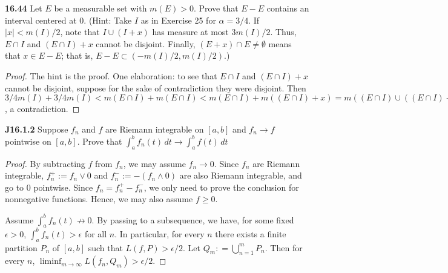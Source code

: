 \documentclass{article}
\newcommand{\p}{\textbf}
\begin{document}
\p{16.44} Let $E$ be a measurable set with $m(E) > 0$. Prove that $E-E$ contains an interval centered at 0. (Hint: Take $I$ as in Exercise 25 for $\alpha = 3/4$. If $|x| < m(I)/2$, note that $I \cup (I + x)$ has measure at most $3m(I)/2$. Thus, $E \cap I $ and $(E \cap I) + x$ cannot be disjoint. Finally, $(E+x) \cap E \neq \emptyset$ means that $x \in E - E$; that is, $E - E \subset (-m(I)/2, m(I)/2)$.)
\begin{proof}
The hint is the proof.  One elaboration: to see that $E \cap I$ and $(E \cap I) +x$ cannot be disjoint, suppose for the sake of contradiction they were disjoint.  Then $3/4 m(I) + 3/4 m(I) < m(E \cap I) + m(E \cap I) < m(E \cap I) + m((E \cap I) + x) = m((E \cap I) \cup ((E \cap I) + x)) = m (E \cap (I \cup (I+x))) \leq m(I \cup I +x) \leq 3/2 m(I)$, a contradiction.
\end{proof}

\begin{comment}
\p{J16.1.1} Suppose $f_n \in C[0,1], 0 \leq f_n \leq 1$, and $f_n \rightarrow 0$ pointwise on $[0,1]$. Prove that $\int_0^1 f_n(t)\,dt \rightarrow 0$ as $n \rightarrow \infty$.
\begin{proof}
\end{proof}
\end{comment}

\p{J16.1.2} Suppose $f_n$ and $f$ are Riemann integrable on $[a,b]$ and $f_n \rightarrow f$ pointwise on $[a,b]$. Prove that $\int_a^b f_n(t) \, dt \rightarrow \int_a^b f(t)\, dt$
\begin{proof}
By subtracting $f$ from $f_n$, we may assume $f_n \rightarrow 0$.  Since $f_n$ are Riemann integrable, $f_n^+ := f_n \vee 0$  and $f_n^- := -(f_n \wedge 0)$ are also Riemann integrable, and go to 0 pointwise.  Since $f_n = f_n^+ - f_n^-$, we only need to prove the conclusion for nonnegative functions. Hence, we may also assume $f \geq 0$.

Assume $\int_a^b f_n(t) \not\rightarrow 0$.  By passing to a subsequence, we have, for some fixed $\epsilon > 0$, $\int_a^b f_n(t) > \epsilon$  for all $n$.  In particular, for every $n$ there exists a finite partition $P_n$ of $[a,b]$ such that $L(f,P) > \epsilon / 2$. Let $Q_m: = \bigcup_{n=1}^m P_n$. Then for every $n$, $\liminf_{m\rightarrow\infty} L(f_n, Q_m) > \epsilon/2$.


\end{proof}
\end{document}
